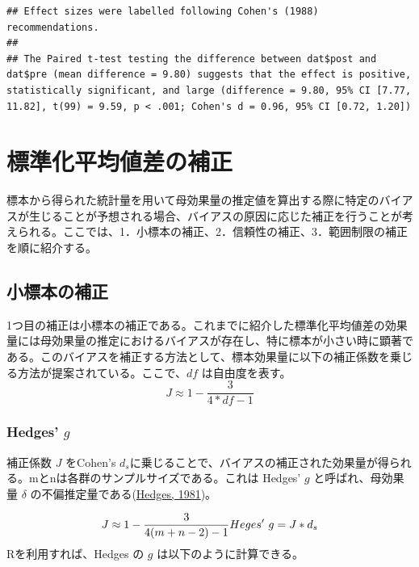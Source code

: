 \documentclass[
  ja=standard, xelatex, base=12pt]{bxjsreport}
\begin{document}
\begin{verbatim}
## Effect sizes were labelled following Cohen's (1988) recommendations.
## 
## The Paired t-test testing the difference between dat$post and dat$pre (mean difference = 9.80) suggests that the effect is positive, statistically significant, and large (difference = 9.80, 95% CI [7.77, 11.82], t(99) = 9.59, p < .001; Cohen's d = 0.96, 95% CI [0.72, 1.20])
\end{verbatim}

\hypertarget{ux6a19ux6e96ux5316ux5e73ux5747ux5024ux5deeux306eux88dcux6b63}{%
\section{標準化平均値差の補正}\label{ux6a19ux6e96ux5316ux5e73ux5747ux5024ux5deeux306eux88dcux6b63}}

標本から得られた統計量を用いて母効果量の推定値を算出する際に特定のバイアスが生じることが予想される場合、バイアスの原因に応じた補正を行うことが考えられる。ここでは、1．小標本の補正、2．信頼性の補正、3．範囲制限の補正を順に紹介する。

\hypertarget{ux5c0fux6a19ux672cux306eux88dcux6b63}{%
\subsection{小標本の補正}\label{ux5c0fux6a19ux672cux306eux88dcux6b63}}

1つ目の補正は小標本の補正である。これまでに紹介した標準化平均値差の効果量には母効果量の推定におけるバイアスが存在し、特に標本が小さい時に顕著である。このバイアスを補正する方法として、標本効果量に以下の補正係数を乗じる方法が提案されている。ここで、\(df\) は自由度を表す。 \[
J\approx1-\frac{3}{4*df-1}
\]

\hypertarget{hedges-g}{%
\subsubsection{\texorpdfstring{Hedges' \(g\)}{Hedges' g}}\label{hedges-g}}

補正係数 \(J\) をCohen's \(d_s\)に乗じることで、バイアスの補正された効果量が得られる。mとnは各群のサンプルサイズである。これは Hedges' \(g\) と呼ばれ、母効果量 \(\delta\) の不偏推定量である(\protect\hyperlink{ref-hedges1981}{Hedges, 1981})。

\[
J\approx1-\frac{3}{4(m+n-2)-1}\\
Heges'~g=J*d_s
\] Rを利用すれば、Hedges の \(g\) は以下のように計算できる。
\end{document}
